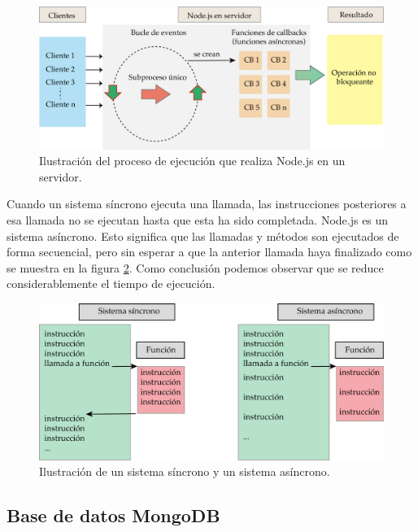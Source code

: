 \begin{figure}[htpb]
	\centering
	\includegraphics[scale=.65]{./Figures/node-esquema.png}
	\caption[Ejecución de Node.js en servidor ]{Ilustración del proceso de ejecución que realiza Node.js en un servidor.}
	\label{fig:node-esquema}
\end{figure}

Cuando un sistema síncrono ejecuta una llamada, las instrucciones posteriores a esa llamada no se ejecutan hasta que esta ha sido completada. Node.js es un sistema asíncrono. Esto significa que las llamadas y métodos son
ejecutados de forma secuencial, pero sin esperar a que la anterior llamada haya finalizado como se muestra en la figura \ref{fig:sinc-async}. Como conclusión podemos observar que se reduce considerablemente el tiempo de ejecución.

\begin{figure}[htpb]
	\centering
	\includegraphics[scale=.65]{./Figures/funciones-asinc.png}
	\caption[Funciones síncronas y asíncronas ]{Ilustración de un sistema síncrono y un sistema asíncrono.}
	\label{fig:sinc-async}
\end{figure}


\subsection{Base de datos MongoDB}

